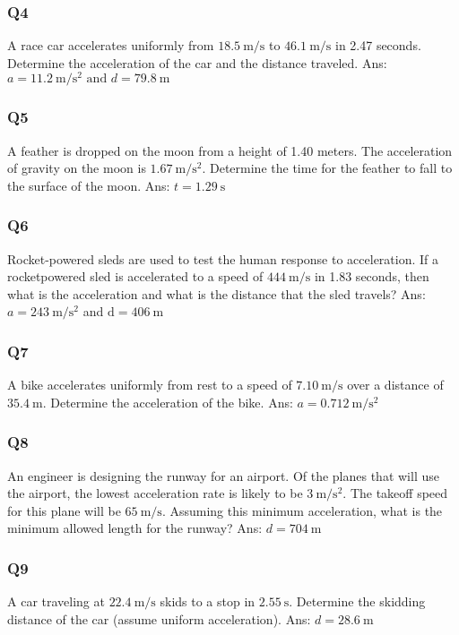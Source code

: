 \documentclass{article}
\begin{document}
\subsubsection{Q4}
A race car accelerates uniformly from $18.5 \mathrm{~m} / \mathrm{s}$ to $46.1 \mathrm{~m} / \mathrm{s}$ in 2.47 seconds. Determine the acceleration of the car and the distance traveled. 
\ifpaper Ans: $a=11.2 \mathrm{~m} / \mathrm{s}^2 \text { and } d=79.8 \mathrm{~m}$ \fi 
\subsubsection{Q5}
A feather is dropped on the moon from a height of 1.40 meters. The acceleration of gravity on the moon is $1.67 \mathrm{~m} / \mathrm{s}^2$. Determine the time for the feather to fall to the surface of the moon.
\ifpaper Ans: $t=1.29 \mathrm{~s}$ \fi 
\subsubsection{Q6}
Rocket-powered sleds are used to test the human response to acceleration. If a rocketpowered sled is accelerated to a speed of $444 \mathrm{~m} / \mathrm{s}$ in 1.83 seconds, then what is the acceleration and what is the distance that the sled travels? 
\ifpaper Ans: $a=243 \mathrm{~m} / \mathrm{s}^2$ and $\mathrm{d}=406 \mathrm{~m}$ \fi 
\subsubsection{Q7}
A bike accelerates uniformly from rest to a speed of $7.10 \mathrm{~m} / \mathrm{s}$ over a distance of $35.4 \mathrm{~m}$. Determine the acceleration of the bike.
\ifpaper Ans: $a=0.712 \mathrm{~m} / \mathrm{s}^2$ \fi 
\subsubsection{Q8}
An engineer is designing the runway for an airport. Of the planes that will use the airport, the lowest acceleration rate is likely to be $3 \mathrm{~m} / \mathrm{s}^2$. The takeoff speed for this plane will be $65 \mathrm{~m} / \mathrm{s}$. Assuming this minimum acceleration, what is the minimum allowed length for the runway?
\ifpaper Ans: $d=704 \mathrm{~m}$ \fi 
\subsubsection{Q9}
A car traveling at $22.4 \mathrm{~m} / \mathrm{s}$ skids to a stop in $2.55 \mathrm{~s}$. Determine the skidding distance of the car (assume uniform acceleration).
\ifpaper Ans: $d=28.6 \mathrm{~m}$ \fi 
\end{document}
